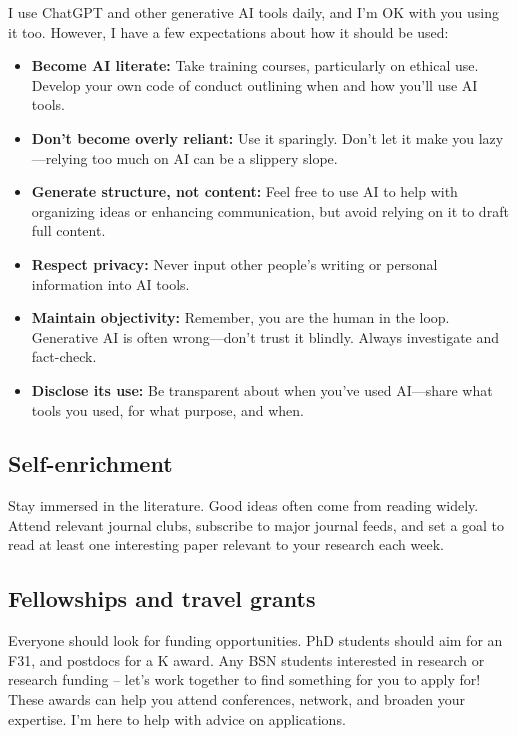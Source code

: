 \documentclass[
  letterpaper,
  DIV=11,
  numbers=noendperiod]{scrreprt}
\providecommand{\tightlist}{%
  \setlength{\itemsep}{0pt}\setlength{\parskip}{0pt}}\usepackage{longtable,booktabs,array}
\begin{document}
I use ChatGPT and other generative AI tools daily, and I'm OK with you
using it too. However, I have a few expectations about how it should be
used:

\begin{itemize}
\tightlist
\item
  \textbf{Become AI literate:} Take training courses, particularly on
  ethical use. Develop your own code of conduct outlining when and how
  you'll use AI tools.
\item
  \textbf{Don't become overly reliant:} Use it sparingly. Don't let it
  make you lazy---relying too much on AI can be a slippery slope.
\item
  \textbf{Generate structure, not content:} Feel free to use AI to help
  with organizing ideas or enhancing communication, but avoid relying on
  it to draft full content.
\item
  \textbf{Respect privacy:} Never input other people's writing or
  personal information into AI tools.
\item
  \textbf{Maintain objectivity:} Remember, you are the human in the
  loop. Generative AI is often wrong---don't trust it blindly. Always
  investigate and fact-check.
\item
  \textbf{Disclose its use:} Be transparent about when you've used
  AI---share what tools you used, for what purpose, and when.
\end{itemize}

\subsection*{Self-enrichment}\label{self-enrichment}

Stay immersed in the literature. Good ideas often come from reading
widely. Attend relevant journal clubs, subscribe to major journal feeds,
and set a goal to read at least one interesting paper relevant to your
research each week.

\subsection*{Fellowships and travel
grants}\label{fellowships-and-travel-grants}

Everyone should look for funding opportunities. PhD students should aim
for an F31, and postdocs for a K award. Any BSN students interested in
research or research funding -- let's work together to find something
for you to apply for! These awards can help you attend conferences,
network, and broaden your expertise. I'm here to help with advice on
applications.
\end{document}
